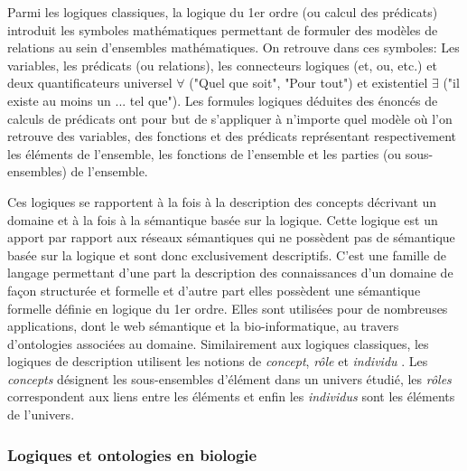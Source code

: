 Parmi les logiques classiques, la logique du 1er ordre (ou calcul des prédicats) introduit les symboles mathématiques permettant de formuler des modèles de relations au sein d'ensembles mathématiques. On retrouve dans ces symboles: Les variables, les prédicats (ou relations), les connecteurs logiques (et, ou, etc.) et deux quantificateurs universel $\forall$ ("Quel que soit", "Pour tout") et existentiel $\exists$ ("il existe au moins un ... tel que"). Les formules logiques déduites des énoncés de calculs de prédicats ont pour but de s'appliquer à n'importe quel modèle où l'on retrouve des variables, des fonctions et des prédicats représentant respectivement les éléments de l'ensemble, les fonctions de l'ensemble et les parties (ou sous-ensembles) de l'ensemble.



Ces logiques se rapportent à la fois à la description des concepts décrivant un domaine et à la fois à la sémantique basée sur la logique. Cette logique est un apport par rapport aux réseaux sémantiques qui ne possèdent pas de sémantique basée sur la logique et sont donc exclusivement descriptifs. C'est une famille de langage permettant d'une part la description des connaissances d'un domaine de façon structurée et formelle et d'autre part elles possèdent une sémantique formelle définie en logique du 1er ordre. Elles sont utilisées pour de nombreuses applications, dont le web sémantique et la bio-informatique, au travers d'ontologies associées au domaine. 
Similairement aux logiques classiques, les logiques de description utilisent les notions de \textit{concept}, \textit{rôle} et \textit{individu} \cite{baader2003description}. Les \textit{concepts} désignent les sous-ensembles d'élément dans un univers étudié, les \textit{rôles} correspondent aux liens entre les éléments et enfin les \textit{individus} sont les éléments de l'univers.


\subsubsection{Logiques et ontologies en biologie}

